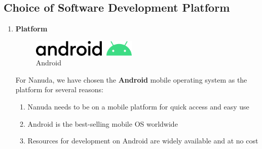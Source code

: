 \documentclass[conference]{IEEEtran}
\begin{document}
\subsection{Choice of Software Development Platform}
\begin{enumerate}
    \item \textbf{Platform}
        \newline
        \begin{figure}[htbp]
            \centerline{\includegraphics[width=50mm,scale=0.5]{img/logo-android.png}}
            \caption{Android}
            \label{fig:my_label}
        \end{figure}
        \newline
        For Nanuda, we have chosen the \textbf{Android} mobile operating system as the platform for several reasons:
        \begin{enumerate}
            \item Nanuda needs to be on a mobile platform for quick access and easy use
            \item Android is the best-selling mobile OS worldwide
            \item Resources for development on Android are widely available and at no cost
        \end{enumerate}
        

\end{enumerate}
\end{document}

